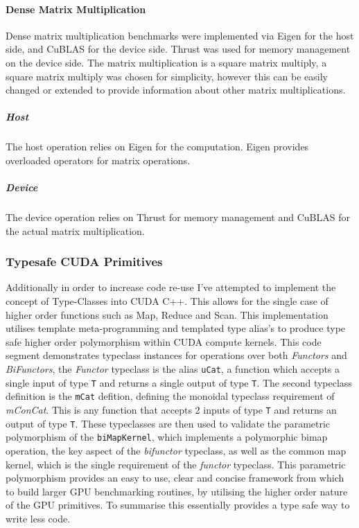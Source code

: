 \paragraph{Dense Matrix Multiplication}
Dense matrix multiplication benchmarks were implemented via Eigen for the host side, and CuBLAS for
the device side. Thrust was used for memory management on the device side. The matrix multiplication
is a square matrix multiply, a square matrix multiply was chosen for simplicity, however this can be
easily changed or extended to provide information about other matrix multiplications.

\subparagraph{Host}
The host operation relies on Eigen for the computation. Eigen provides overloaded operators for
matrix operations.


\subparagraph{Device}
The device operation relies on Thrust for memory management and CuBLAS for the actual matrix
multiplication.


\subsubsection{Typesafe CUDA Primitives} 
Additionally in order to increase code re-use I've attempted to implement the concept of
Type-Classes into CUDA C++. This allows for the single case of higher order functions such as Map,
Reduce and Scan. This implementation utilises template meta-programming and templated type alias's
to produce type safe higher order polymorphism within CUDA compute kernels.
 This code segment demonstrates typeclass instances for
operations over both \textit{Functors} and \textit{BiFunctors}, the \textit{Functor} typeclass is
the alias \lstinline{uCat}, a function which accepts a single input of type \lstinline{T} and
returns a single output of type \lstinline{T}. The second typeclass definition is the
\lstinline{mCat} defition, defining the monoidal typeclass requirement of \textit{mConCat}. This is
any function that accepts 2 inputs of type \lstinline{T} and returns an output of type
\lstinline{T}. These typeclasses are then used to validate the parametric polymorphism of the
\lstinline{biMapKernel}, which implements a polymorphic bimap operation, the key aspect of the
\textit{bifunctor} typeclass, as well as the common map kernel, which is the single requirement of
the \textit{functor} typeclass. This parametric polymorphism provides an easy to use, clear and
concise framework from which to build larger GPU benchmarking routines, by utilising the higher
order nature of the GPU primitives. To summarise this essentially provides a type safe way to write
less code.
